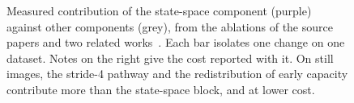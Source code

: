 \begin{figure}[htbp]
\vspace{2mm}
\caption[Measured contribution of the state-space component against other
components]{Measured contribution of the state-space component (purple)
against other components (grey), from the ablations of the source papers and
two related works~\citep{li2025cfmw,yang2026uavdet,hatamizadeh2025mambavision,wang2025hpsdetr,mambapsa2026,wang2025mambayolo,yolo11_2024}.
Each bar isolates one change on one dataset. Notes on the right give the
cost reported with it. On still images, the stride-4 pathway and the
redistribution of early capacity contribute more than the state-space block,
and at lower cost.}
\label{fig:gains}
\end{figure}

